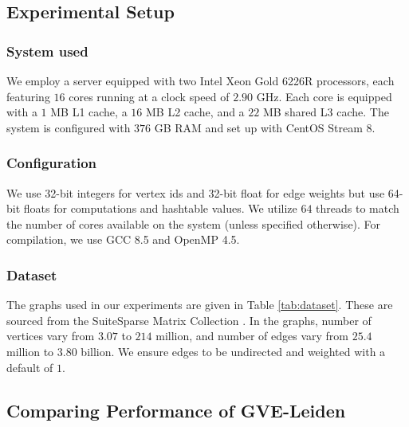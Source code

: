 \subsection{Experimental Setup}
\label{sec:setup}

\subsubsection{System used}

We employ a server equipped with two Intel Xeon Gold 6226R processors, each featuring $16$ cores running at a clock speed of $2.90$ GHz. Each core is equipped with a $1$ MB L1 cache, a $16$ MB L2 cache, and a $22$ MB shared L3 cache. The system is configured with $376$ GB RAM and set up with CentOS Stream 8.


\subsubsection{Configuration}

We use 32-bit integers for vertex ids and 32-bit float for edge weights but use 64-bit floats for computations and hashtable values. We utilize $64$ threads to match the number of cores available on the system (unless specified otherwise). For compilation, we use GCC 8.5 and OpenMP 4.5.


\subsubsection{Dataset}

The graphs used in our experiments are given in Table \ref{tab:dataset}. These are sourced from the SuiteSparse Matrix Collection \cite{suite19}. In the graphs, number of vertices vary from $3.07$ to $214$ million, and number of edges vary from $25.4$ million to $3.80$ billion. We ensure edges to be undirected and weighted with a default of $1$.








\subsection{Comparing Performance of GVE-Leiden}
\label{sec:comparison}

